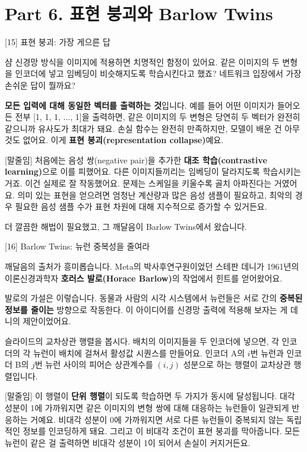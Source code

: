 \documentclass[aspectratio=169,10pt]{beamer}
\newenvironment{script}{%
  \footnotesize
  \setlength{\parskip}{0.5em}
  \setlength{\parindent}{0pt}
}{}
\begin{document}
\section{Part 6. 표현 붕괴와 Barlow Twins}

\begin{frame}{[15] 표현 붕괴: 가장 게으른 답}
\begin{script}
샴 신경망 방식을 이미지에 적용하면 치명적인 함정이 있어요. 같은 이미지의 두 변형을 인코더에 넣고 임베딩이 비슷해지도록 학습시킨다고 했죠? 네트워크 입장에서 가장 손쉬운 답이 뭘까요?

\textbf{모든 입력에 대해 동일한 벡터를 출력하는 것}입니다. 예를 들어 어떤 이미지가 들어오든 전부 [1, 1, 1, ..., 1]을 출력하면, 같은 이미지의 두 변형은 당연히 두 벡터가 완전히 같으니까 유사도가 최대가 돼요. 손실 함수는 완전히 만족하지만, 모델이 배운 건 \alert{아무것도 없어요}. 이게 \textbf{표현 붕괴(representation collapse)}예요.

[말줄임] 처음에는 음성 쌍(negative pair)을 추가한 \textbf{대조 학습(contrastive learning)}으로 이를 피했어요. 다른 이미지들끼리는 임베딩이 달라지도록 학습시키는 거죠. 이건 실제로 잘 작동했어요. 문제는 스케일을 키울수록 골치 아파진다는 거였어요. 의미 있는 표현을 얻으려면 엄청난 계산량과 많은 음성 샘플이 필요하고, 최악의 경우 필요한 음성 샘플 수가 표현 차원에 대해 지수적으로 증가할 수 있거든요.

더 깔끔한 해법이 필요했고, 그 깨달음이 Barlow Twins에서 왔습니다.
\end{script}
\end{frame}

\begin{frame}{[16] Barlow Twins: 뉴런 중복성을 줄여라}
\begin{script}
깨달음의 출처가 흥미롭습니다. Meta의 박사후연구원이었던 스테판 데니가 1961년의 이론신경과학자 \textbf{호러스 발로(Horace Barlow)}의 작업에서 힌트를 얻어왔어요.

발로의 가설은 이렇습니다. 동물과 사람의 시각 시스템에서 뉴런들은 서로 간의 \textbf{중복된 정보를 줄이는} 방향으로 작동한다. 이 아이디어를 신경망 출력에 적용해 보자는 게 데니의 제안이었어요.

슬라이드의 교차상관 행렬을 봅시다. 배치의 이미지들을 두 인코더에 넣으면, 각 인코더의 각 뉴런이 배치에 걸쳐서 활성값 시퀀스를 만들어요. 인코더 A의 $i$번 뉴런과 인코더 B의 $j$번 뉴런 사이의 피어슨 상관계수를 $(i,j)$ 성분으로 하는 행렬이 교차상관 행렬입니다.

[말줄임] 이 행렬이 \textbf{단위 행렬}이 되도록 학습하면 두 가지가 동시에 달성됩니다. 대각 성분이 1에 가까워지면 같은 이미지의 변형 쌍에 대해 대응하는 뉴런들이 일관되게 반응하는 거예요. 비대각 성분이 0에 가까워지면 서로 다른 뉴런들이 중복되지 않는 독립적인 정보를 인코딩하게 돼요. 그리고 이 비대각 조건이 표현 붕괴를 막아줍니다. 모든 뉴런이 같은 걸 출력하면 비대각 성분이 1이 되어서 손실이 커지거든요.
\end{script}
\end{frame}
\end{document}
